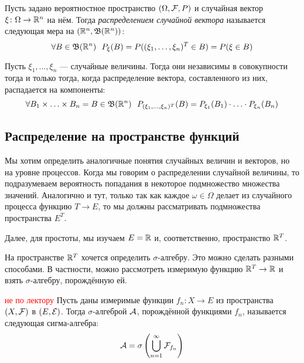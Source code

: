 \begin{reminder}
	Пусть задано вероятностное пространство $(\Omega, \mathcal{F}, P)$ и случайная вектор $\xi \colon \Omega \to \mathbb{R}^n$ на нём. Тогда \textit{распределением случайной вектора} называется следующая мера на $(\mathbb{R}^n, \mathfrak{B}(\mathbb{R}^n))$:
	\[
	\forall B \in \mathfrak{B}(\mathbb{R}^n)\ \ P_\xi(B) = P((\xi_1, \ldots, \xi_n)^T \in B) = P(\xi \in B)
	\]
\end{reminder}

\begin{reminder}
	Пусть $\xi_1, \ldots, \xi_n$ --- случайные величины. Тогда они независимы в совокупности тогда и только тогда, когда распределение вектора, составленного из них, распадается на компоненты:
	\[
		\forall B_1 \times \ldots \times B_n = B \in \mathfrak{B}(\mathbb{R}^n)\ \ P_{(\xi_1, \ldots, \xi_n)^T}(B) = P_{\xi_1}(B_1) \cdot \ldots \cdot P_{\xi_n}(B_n)
	\]
\end{reminder}

\subsection{Распределение на пространстве функций}

\begin{note}
	Мы хотим определить аналогичные понятия случайных величин и векторов, но на уровне процессов. Когда мы говорим о распределении случайной величины, то подразумеваем вероятность попадания в некоторое подмножество множества значений. Аналогично и тут, только так как каждое $\omega \in \Omega$ делает из случайного процесса функцию $T \to E$, то мы должны рассматривать подмножества пространства $E^T$.
\end{note}

\begin{note}
	Далее, для простоты, мы изучаем $E = \mathbb{R}$ и, соответственно, пространство $\mathbb{R}^T$.
\end{note}

\begin{note}
	На пространстве $\mathbb{R}^T$ хочется определить $\sigma$-алгебру. Это можно сделать разными способами. В частности, можно рассмотреть измеримую функцию $\mathbb{R}^T \to \mathbb{R}$ и взять $\sigma$-алгебру, порождённую ей.
\end{note}

\begin{definition} \textcolor{red}{не по лектору}
	Пусть даны измеримые функции $f_n \colon X \to E$ из пространства $(X, \mathcal{F})$ в $(E, \mathcal{E})$. Тогда $\sigma$-алгеброй $\mathcal{A}$, порождённой функциями $f_n$, называется следующая сигма-алгебра:
	\[
		\mathcal{A} = \sigma\left(\bigcup_{n = 1}^\infty \mathcal{F}_{f_n}\right)
	\]
\end{definition}

